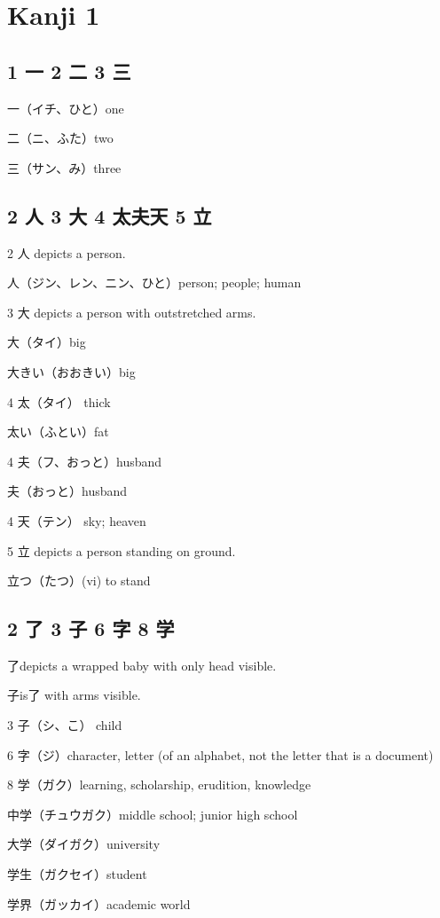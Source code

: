 \chapter{Kanji 1}

\section{1 一 2 二 3 三}

一（イチ、ひと）one

二（ニ、ふた）two

三（サン、み）three

\section{2 人 3 大 4 太夫天 5 立}

2 人 depicts a person.

人（ジン、レン、ニン、ひと）person; people; human

3 大 depicts a person with outstretched arms.

大（タイ）big

大きい（おおきい）big

4 太（タイ） thick

太い（ふとい）fat

4 夫（フ、おっと）husband

夫（おっと）husband

4 天（テン） sky; heaven

5 立 depicts a person standing on ground.

立つ（たつ）(vi) to stand

\section{2 了 3 子 6 字 8 学}

了depicts a wrapped baby with only head visible.

子is了 with arms visible.

3 子（シ、こ） child

6 字（ジ）character, letter (of an alphabet, not the letter that is a document)

8 学（ガク）learning, scholarship, erudition, knowledge

中学（チュウガク）middle school; junior high school

大学（ダイガク）university

学生（ガクセイ）student

学界（ガッカイ）academic world

